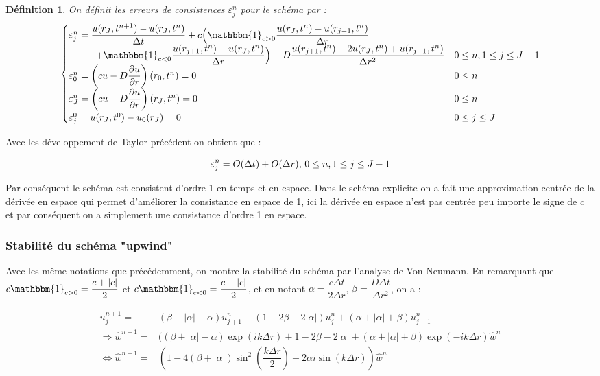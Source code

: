 \documentclass[a4paper,fleqn,leqno]{article}
\newtheorem*{definition}{Définition}
\begin{document}
\begin{definition}
On définit les erreurs de consistences $\varepsilon^n_j$ pour le schéma par :
\begin{equation*}
\begin{cases}
\varepsilon^n_j = \dfrac{u(r_J,t^{n+1}) - u(r_J,t^n)}{\Delta t} +c \Big( \mathbbm{1}_{c>0}\dfrac{u(r_J,t^n) - u(r_{j-1},t^n)}{\Delta r} \\ \hspace{1cm} +\mathbbm{1}_{c<0}\dfrac{u(r_{j+1},t^n) - u(r_J,t^n)}{\Delta r}\Big) -D\dfrac{u(r_{j+1},t^n)-2u(r_J,t^n) + u(r_{j-1},t^n)}{\Delta r^2} 
& 0\leq n, 1\leq j\leq J-1 \\
\varepsilon^n_0 = \left(cu-D\dfrac{\partial u}{\partial r}\right)(r_0,t^n)=0 & 0\leq n \\
\varepsilon^n_J = \left(cu-D\dfrac{\partial u}{\partial r}\right)(r_J,t^n)=0 & 0\leq n \\
\varepsilon^0_j = u(r_J,t^0) - u_0(r_J) = 0 & 0\leq j\leq J \\
\end{cases}
\end{equation*}
\end{definition}

Avec les développement de Taylor précédent on obtient que :

\[\varepsilon^n_j = O(\Delta t) + O(\Delta r)$, $ 0\leq n, 1\leq j\leq J-1\]

Par conséquent le schéma est consistent d’ordre 1 en temps et en espace. Dans le schéma explicite on a fait une approximation centrée de la dérivée en espace qui permet d'améliorer la consistance en espace de 1, ici la dérivée en espace n'est pas centrée peu importe le signe de $c$ et par conséquent on a simplement une consistance d'ordre 1 en espace.

\subsubsection{Stabilité du schéma "upwind"}

Avec les même notations que précédemment, on montre la stabilité du schéma par l'analyse de Von Neumann.
En remarquant que $c\mathbbm{1}_{c>0} = \dfrac{c + |c|}{2}$ et $c\mathbbm{1}_{c<0} = \dfrac{c - |c|}{2}$, et en notant $\alpha = \dfrac{c\Delta t}{2\Delta r}$, $\beta = \dfrac{D\Delta t}{\Delta r^2}$, on a :

\begin{equation*}
\begin{array}{rl}
u^{n+1}_j =& (\beta+|\alpha|-\alpha)u^n_{j+1} + (1 - 2\beta -2|\alpha|)u^n_j + (\alpha + |\alpha| + \beta)u^n_{j-1}\\
\Rightarrow \hat{w}^{n+1} =& ((\beta+|\alpha|-\alpha)\exp(ik\Delta r) + 1 - 2\beta -2|\alpha| + (\alpha + |\alpha| + \beta)\exp(-ik\Delta r)\hat{w}^n\\
\Leftrightarrow \hat{w}^{n+1} =& (1 - 4(\beta + |\alpha|)\sin^2(\dfrac{k\Delta r}{2})- 2\alpha i\sin(k\Delta r))\hat{w}^n\\
\end{array}
\end{equation*}
\end{document}
